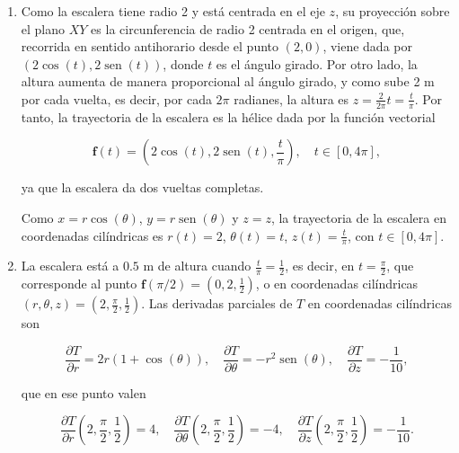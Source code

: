 \documentclass[
  spanish,
  a4paper,
]{scrreport}
\theoremstyle{definition}
\theoremstyle{remark}
\begin{document}
\begin{tcolorbox}[enhanced jigsaw, arc=.35mm, bottomrule=.15mm, bottomtitle=1mm, breakable, colback=white, colbacktitle=quarto-callout-tip-color!10!white, colframe=quarto-callout-tip-color-frame, coltitle=black, left=2mm, leftrule=.75mm, opacityback=0, opacitybacktitle=0.6, rightrule=.15mm, title=\textcolor{quarto-callout-tip-color}{\faLightbulb}\hspace{0.5em}{Solución}, titlerule=0mm, toprule=.15mm, toptitle=1mm]

\begin{enumerate}
\def\labelenumi{\alph{enumi}.}
\item
  Como la escalera tiene radio 2 y está centrada en el eje \(z\), su
  proyección sobre el plano \(XY\) es la circunferencia de radio 2
  centrada en el origen, que, recorrida en sentido antihorario desde el
  punto \((2,0)\), viene dada por
  \((2\cos(t), 2\operatorname{sen}(t))\), donde \(t\) es el ángulo
  girado. Por otro lado, la altura aumenta de manera proporcional al
  ángulo girado, y como sube 2 m por cada vuelta, es decir, por cada
  \(2\pi\) radianes, la altura es
  \(z = \frac{2}{2\pi}t = \frac{t}{\pi}\). Por tanto, la trayectoria de
  la escalera es la hélice dada por la función vectorial

  \[
  \mathbf{f}(t) = \left(2\cos(t), 2\operatorname{sen}(t), \frac{t}{\pi}\right), \quad t\in[0,4\pi],
  \]

  ya que la escalera da dos vueltas completas.

  Como \(x = r\cos(\theta)\), \(y = r\operatorname{sen}(\theta)\) y
  \(z=z\), la trayectoria de la escalera en coordenadas cilíndricas es
  \(r(t) = 2\), \(\theta(t) = t\), \(z(t) = \frac{t}{\pi}\), con
  \(t\in[0,4\pi]\).
\item
  La escalera está a \(0.5\) m de altura cuando
  \(\frac{t}{\pi} = \frac{1}{2}\), es decir, en \(t = \frac{\pi}{2}\),
  que corresponde al punto
  \(\mathbf{f}(\pi/2) = \left(0, 2, \frac{1}{2}\right)\), o en
  coordenadas cilíndricas
  \((r,\theta,z) = \left(2, \frac{\pi}{2}, \frac{1}{2}\right)\). Las
  derivadas parciales de \(T\) en coordenadas cilíndricas son

  \[
  \frac{\partial T}{\partial r} = 2r(1+\cos(\theta)), \quad 
  \frac{\partial T}{\partial \theta} = -r^2\operatorname{sen}(\theta), \quad
  \frac{\partial T}{\partial z} = -\frac{1}{10},
  \]

  que en ese punto valen

  \[
  \frac{\partial T}{\partial r}\left(2, \frac{\pi}{2}, \frac{1}{2}\right) = 4, \quad 
  \frac{\partial T}{\partial \theta}\left(2, \frac{\pi}{2}, \frac{1}{2}\right) = -4, \quad
  \frac{\partial T}{\partial z}\left(2, \frac{\pi}{2}, \frac{1}{2}\right) = -\frac{1}{10}.
  \]


\end{enumerate}
\end{tcolorbox}
\end{document}

